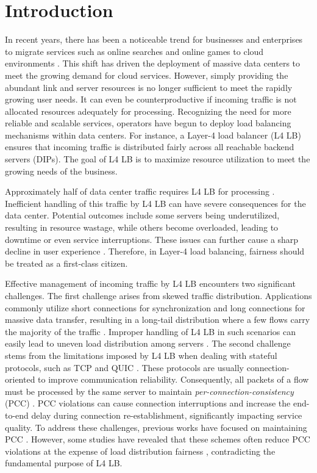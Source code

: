 \section{Introduction}
In recent years, there has been a noticeable trend for businesses and enterprises to migrate services such as online searches and online games to cloud environments \cite{yao2022hlb}. This shift has driven the deployment of massive data centers to meet the growing demand for cloud services. However, simply providing the abundant link and server resources \cite{greenberg2009vl2} is no longer sufficient to meet the rapidly growing user needs. It can even be counterproductive if incoming traffic is not allocated resources adequately for processing. Recognizing the need for more reliable and scalable services, operators have begun to deploy load balancing mechanisms within data centers. For instance, a Layer-4 load balancer (L4 LB) ensures that incoming traffic is distributed fairly across all reachable backend servers (DIPs). The goal of L4 LB is to maximize resource utilization to meet the growing needs of the business.

Approximately half of data center traffic requires L4 LB for processing \cite{patel2013ananta}.  Inefficient handling of this traffic by L4 LB can have severe consequences for the data center. Potential outcomes include some servers being underutilized, resulting in resource wastage, while others become overloaded, leading to downtime or even service interruptions. These issues can further cause a sharp decline in user experience \cite{miao2017silkroad}. Therefore, in Layer-4 load balancing, fairness should be treated as a first-class citizen.

Effective management of incoming traffic by L4 LB encounters two significant challenges. The first challenge arises from skewed traffic distribution. Applications commonly utilize short connections for synchronization and long connections for massive data transfer, resulting in a long-tail distribution where a few flows carry the majority of the traffic \cite{zeng2022tiara}. Improper handling of L4 LB in such scenarios can easily lead to uneven load distribution among servers \cite{aghdai2020spotlight}. The second challenge stems from the limitations imposed by L4 LB when dealing with stateful protocols, such as TCP and QUIC \cite{langley2017quic}. These protocols are usually connection-oriented to improve communication reliability. Consequently, all packets of a flow must be processed by the same server to maintain \emph{per-connection-consistency} (PCC) \cite{miao2017silkroad}. PCC violations can cause connection interruptions and increase the end-to-end delay during connection re-establishment, significantly impacting service quality. To address these challenges, previous works have focused on maintaining PCC \cite{eisenbud2016maglev, olteanu2018stateless, gandhi2014duet, araujo2018balancing}. However, some studies have revealed that these schemes often reduce PCC violations at the expense of load distribution fairness \cite{barbette2021cheetah}, contradicting the fundamental purpose of L4 LB.


